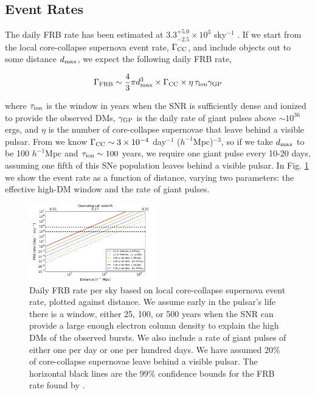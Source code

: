 \documentclass[useAMS,usenatbib]{mn2e}
\begin{document}
\subsection{Event Rates}
\label{rates}

The daily FRB rate has been estimated at $3.3^{+5.0}_{-2.5}\times10^3$ sky$^{-1}$ 
\citep{2015arXiv150500834R}. If we start from the local core-collapse supernova
event rate, $\Gamma_{\rm CC}$, and include objects out to some distance $d_{\rm max}$,
we expect the following daily FRB rate, 

\begin{equation}
\Gamma_{\rm FRB} \sim  \frac{4}{3} \pi d_{\rm max}^3 \times \Gamma_{\rm CC} \times
 \eta \, \tau_{\rm ion} \gamma_{\rm GP}
\end{equation}

\noindent where $\tau_{\rm ion}$ is the window in years when the SNR is sufficiently
dense and ionized to provide the observed DMs, $\gamma_{\rm GP}$
is the daily rate of giant pulses above $\sim10^{36}$ ergs, and $\eta$
is the number of core-collapse supernovae that leave behind a visible pulsar. 
From \cite{2014ApJ...792..135T} we know  
$\Gamma_{\rm CC}\sim3 \times 10^{-4}$ day$^{-1}$ ($h^{-1}$Mpc)$^{-3}$,
so if we take $d_{\rm max}$ to be 100 $h^{-1}$Mpc and $\tau_{\rm ion}\sim100$ years,
we require one giant pulse every 10-20 days, assuming one fifth of this SNe population
leaves behind a visible pulsar.
In Fig. \ref{FIG-RATE} 
we show the event rate as a function of distance, varying two parameters: the 
effective high-DM window and the rate of giant pulses. 

\begin{figure}
\label{FIG-RATE}
  \centering
   \includegraphics[width=0.5\textwidth]{FRB_SNR_rate.png}
   \caption{Daily FRB rate per sky based on local core-collapse supernova 
   event rate, plotted against distance.
   We assume early in the pulsar's life there is a window, either 
   25, 100, or 500 years when the SNR can provide a large enough electron 
   column density to explain the high DMs of the observed bursts. We also
   include a rate of giant pulses of either one per day or one per hundred
   days. We have assumed 20$\%$ of core-collapse supernovae leave behind
   a visible pulsar.
   The horizontal black lines are the $99\%$ confidence bounds for the FRB rate
   found by \protect\cite{2015arXiv150500834R}.}
\end{figure}
\end{document}
